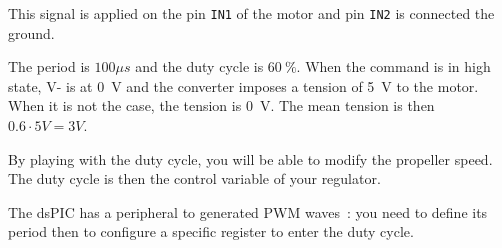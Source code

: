 \documentclass[11pt,a4paper]{article}
\theoremstyle{definition}%
\begin{document}
This signal is applied on the pin \texttt{IN1} of the motor and pin \texttt{IN2} is connected the ground.

The period is $100 \mu s$ and the duty cycle is $60~\%$.
When the command is in high state, V- is at 0~V and the converter imposes a tension of 5~V to the motor.
When it is not the case, the tension is 0~V.
The mean tension is then $0.6 \cdot 5V  = 3 V$.

\begin{framed}
By playing with the duty cycle, you will be able to modify the propeller speed.
The duty cycle is then the control variable of your regulator.
\end{framed}

The dsPIC has a peripheral to generated PWM waves~: you need to define its period then to configure a specific register to enter the duty cycle.
\end{document}
